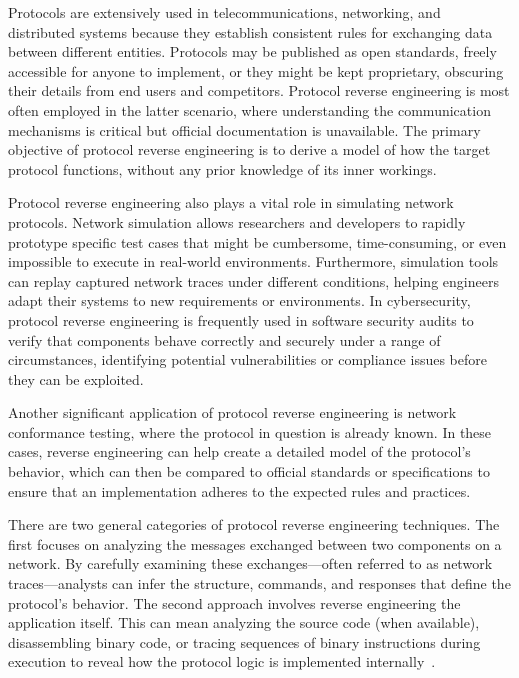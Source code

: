 Protocols are extensively used in telecommunications, networking, and distributed systems because they establish consistent rules for exchanging data between different entities. Protocols may be published as open standards, freely accessible for anyone to implement, or they might be kept proprietary, obscuring their details from end users and competitors. Protocol reverse engineering is most often employed in the latter scenario, where understanding the communication mechanisms is critical but official documentation is unavailable. The primary objective of protocol reverse engineering is to derive a model of how the target protocol functions, without any prior knowledge of its inner workings.

Protocol reverse engineering also plays a vital role in simulating network protocols. Network simulation allows researchers and developers to rapidly prototype specific test cases that might be cumbersome, time-consuming, or even impossible to execute in real-world environments. Furthermore, simulation tools can replay captured network traces under different conditions, helping engineers adapt their systems to new requirements or environments. In cybersecurity, protocol reverse engineering is frequently used in software security audits to verify that components behave correctly and securely under a range of circumstances, identifying potential vulnerabilities or compliance issues before they can be exploited.

Another significant application of protocol reverse engineering is network conformance testing, where the protocol in question is already known. In these cases, reverse engineering can help create a detailed model of the protocol’s behavior, which can then be compared to official standards or specifications to ensure that an implementation adheres to the expected rules and practices.

There are two general categories of protocol reverse engineering techniques. The first focuses on analyzing the messages exchanged between two components on a network. By carefully examining these exchanges—often referred to as network traces—analysts can infer the structure, commands, and responses that define the protocol’s behavior. The second approach involves reverse engineering the application itself. This can mean analyzing the source code (when available), disassembling binary code, or tracing sequences of binary instructions during execution to reveal how the protocol logic is implemented internally~\cite{stateofartRE}.


